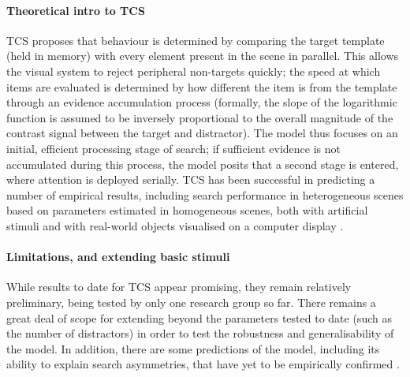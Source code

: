 \documentclass[smallextended]{svjour3}       %
\begin{document}
\paragraph{Theoretical intro to TCS}
TCS proposes that behaviour is determined by comparing the target template (held in memory) with every element present in the scene in parallel. This allows the visual system to reject peripheral non-targets quickly; the speed at which items are evaluated is determined by how different the item is from the template through an evidence accumulation process (formally, the slope of the logarithmic function is assumed to be inversely proportional to the overall magnitude of the contrast signal between the target and distractor). The model thus focuses on an initial, efficient processing stage of search; if sufficient evidence is not accumulated during this process, the model posits that a second stage is entered, where attention is deployed serially. TCS has been successful in predicting a number of empirical results, including search performance in heterogeneous scenes based on parameters estimated in homogeneous scenes, both with artificial stimuli \cite{buetti2016towards,lleras2019predicting} and with real-world objects visualised on a computer display \cite{wang2017predicting}. 
 
\paragraph{Limitations, and extending basic stimuli} While results to date for TCS appear promising, they remain relatively preliminary, being tested by only one research group so far. There remains a great deal of scope for extending beyond the parameters tested to date (such as the number of distractors) in order to test the robustness and generalisability of the model. In addition, there are some predictions of the model, including its ability to explain search asymmetries, that have yet to be empirically confirmed \cite{lleras2020target}.
\end{document}
